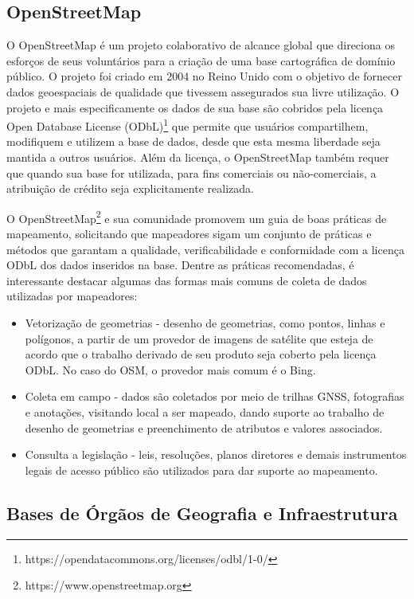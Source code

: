 \documentclass[oneside,openright,12pt]{ufsm_2015} %
\begin{document}
\subsection{OpenStreetMap}
O OpenStreetMap é um projeto colaborativo de alcance global que direciona os esforços de seus voluntários para a criação de uma base cartográfica de domínio público. 
O projeto foi criado em 2004 no Reino Unido com o objetivo de fornecer dados geoespaciais de qualidade que tivessem assegurados sua livre utilização. 
O projeto e mais especificamente os dados de sua base são cobridos pela licença Open Database License (ODbL)\footnote{https://opendatacommons.org/licenses/odbl/1-0/} que permite que usuários compartilhem, modifiquem e utilizem a base de dados, desde que esta mesma liberdade seja mantida a outros usuários. Além da licença, o OpenStreetMap também requer que quando sua base for utilizada, para fins comerciais ou não-comerciais, a atribuição de crédito seja explicitamente realizada. 



O OpenStreetMap\footnote{https://www.openstreetmap.org} e sua comunidade promovem um guia de boas práticas de mapeamento, solicitando que mapeadores sigam um conjunto de práticas e métodos que garantam a qualidade, verificabilidade e conformidade com a licença ODbL dos dados inseridos na base.
Dentre as práticas recomendadas, é interessante destacar algumas das formas mais comuns de coleta de dados utilizadas por mapeadores:
\begin{itemize}
    \item {Vetorização de geometrias} - desenho de geometrias, como pontos, linhas e polígonos, a partir de um provedor de imagens de satélite que esteja de acordo que o trabalho derivado de seu produto seja coberto pela licença ODbL. No caso do OSM, o provedor mais comum é o Bing.
    \item {Coleta em campo} - dados são coletados por meio de trilhas GNSS, fotografias e anotações, visitando local a ser mapeado, dando suporte ao trabalho de desenho de geometrias e preenchimento de atributos e valores associados.
    \item {Consulta a legislação} - leis, resoluções, planos diretores e demais instrumentos legais de acesso público são utilizados para dar suporte ao mapeamento.
\end{itemize}

\subsection{Bases de Órgãos de Geografia e Infraestrutura}
\end{document}
